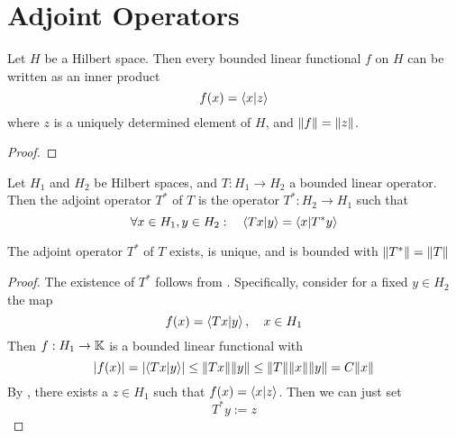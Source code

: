 \documentclass[../../script.tex]{subfiles}
\begin{document}
    \section{Adjoint Operators}

    \begin{thm}\label{thm:riesz}
        Let $H$ be a Hilbert space. Then every bounded linear functional $f$ on $H$ can be written as an inner product 
        \[
            f(x) = \innerproduct{x}{z}
        \]
        where $z$ is a uniquely determined element of $H$, and $\norm{f} = \norm{z}$.
    \end{thm}
    \begin{proof}
        \noproof
    \end{proof}

    \begin{defi}
        Let $H_1$ and $H_2$ be Hilbert spaces, and $T: H_1 \rightarrow H_2$ a bounded linear operator. 
        Then the adjoint operator $T^*$ of $T$ is the operator $T^*: H_2 \rightarrow H_1$ such that 
        \[
            \forall x \in H_1, y \in H_2: \quad \innerproduct{Tx}{y} = \innerproduct{x}{T^*y}
        \]
    \end{defi}

    \begin{thm}
        The adjoint operator $T^*$ of $T$ exists, is unique, and is bounded with $\norm{T^*} = \norm{T}$
    \end{thm}
    \begin{proof}
        The existence of $T^*$ follows from . Specifically, consider for a fixed $y \in H_2$ the map 
        \begin{equation}
            f(x) = \innerproduct{Tx}{y}, \quad x \in H_1
        \end{equation}
        Then $f: H_1 \rightarrow \mathbb{K}$ is a bounded linear functional with 
        \begin{equation}
            \abs{f(x)} = \abs{\innerproduct{Tx}{y}} \le \norm{Tx}\norm{y} \le \norm{T}\norm{x}\norm{y} = C\norm{x}
        \end{equation}
        By , there exists a $z \in H_1$ such that $f(x) = \innerproduct{x}{z}$. Then we can just set 
        \begin{equation}
            T^* y := z
        \end{equation}
    \end{proof}
\end{document}
